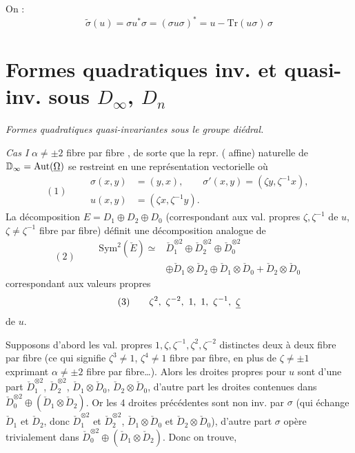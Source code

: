 \documentclass[11pt,a4paper]{article}
\begin{document}
On  :
\[
  \tilde{\sigma}(u) = \sigma u^{*} \sigma = (\sigma u \sigma)^{*} = u - \mathrm{Tr}(u \sigma)\, \sigma
\]

\section{Formes quadratiques inv. et quasi-inv. sous $D_\infty$, $D_n$}

\emph{Formes quadratiques quasi-invariantes sous le groupe diédral.}

\emph{Cas I} \quad $\alpha \neq \pm 2$ fibre par fibre , de sorte que la repr.   (\struck{\ill{}} affine) naturelle de $\mathbb{D}_\infty = \mathrm{Aut}(\uncertain{\Omega})$ se restreint en une représentation vectorielle où
\[
  (1) \qquad
  \begin{aligned}
    \sigma(x,y) &= (y, x), \qquad \sigma'(x,y) = (\zeta y, \zeta^{-1} x), \\
    u(x,y) &= (\zeta x, \zeta^{-1} y) .
  \end{aligned}
\]
La décomposition $E = D_1 \oplus D_2 \oplus D_0$ (correspondant aux val. propres $\zeta, \zeta^{-1}$ de $u$, $\zeta \neq \zeta^{-1}$ fibre par fibre) définit une décomposition analogue de
\[
  (2) \qquad
  \begin{aligned}
    \mathrm{Sym}^2(\check{E}) \simeq{}& \check{D}_1^{\otimes 2} \oplus \check{D}_2^{\otimes 2} \oplus \check{D}_0^{\otimes 2} \\
    &\oplus \check{D}_1 \otimes \check{D}_2 \oplus \check{D}_1 \otimes \check{D}_0 + \check{D}_2 \otimes \check{D}_0
  \end{aligned}
\]
correspondant aux valeurs propres
\[
  (3) \qquad \zeta^{2},\ \zeta^{-2},\ 1,\ 1,\ \zeta^{-1},\ \uncertain{\zeta}
\]
de $u$.

Supposons d'abord les  val. propres $1, \zeta, \zeta^{-1}, \zeta^{2}, \zeta^{-2}$ distinctes deux à deux fibre par fibre (ce qui signifie $\zeta^{3} \neq 1$, $\zeta^{4} \neq 1$ fibre par fibre, en plus de $\zeta \neq \pm 1$  exprimant $\alpha \neq \pm 2$ fibre par fibre…). Alors les droites propres pour $u$ sont  d'une part $\check{D}_1^{\otimes 2}$, $\check{D}_2^{\otimes 2}$, $\check{D}_1 \otimes \check{D}_0$, $\check{D}_2 \otimes \check{D}_0$, d'autre part les droites contenues  dans $\check{D}_0^{\otimes 2} \oplus (\check{D}_1 \otimes \check{D}_2)$. Or les 4 droites précédentes sont non inv. par $\sigma$ (qui échange $\check{D}_1$ et $\check{D}_2$, donc $\check{D}_1^{\otimes 2}$ et $\check{D}_2^{\otimes 2}$, $\check{D}_1 \otimes \check{D}_0$ et $\check{D}_2 \otimes \check{D}_0$), d'autre part $\sigma$ opère trivialement dans $\check{D}_0^{\otimes 2} \oplus (\check{D}_1 \otimes \check{D}_2)$. Donc on trouve,  
\end{document}
